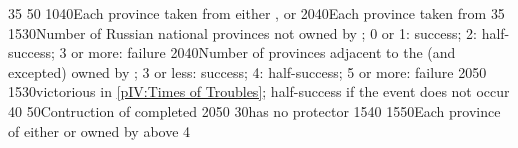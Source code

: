%
{}{35}{}%
%
{}{50}{}%
%
%
%
%
{10}{40}{Each province taken from either \paysmajeurPologne,
  \paysmajeurLithuanie or \paysukraine}%
%
%
{20}{40}{Each province taken from \paysCrimee}%
%
{}{35}{}%
%
%
%
%
{15}{30}{Number of Russian national provinces not owned by \paysmajeurRussie;
  0 or 1: success; 2: half-success; 3 or more: failure}%
%
{20}{40}{Number of provinces adjacent to the \regionBaltique (\regionSuede and
  \regionFinlande excepted) owned by \paysmajeurSuede; 3 or less: success; 4:
  half-success; 5 or more: failure}%
%
{20}{50}{}%
%
{15}{30}{\RUS victorious in \ref{pIV:Times of Troubles}; half-success if the
  event does not occur}%
%
%
%
%
{}{40}{}%
%
{}{50}{Contruction of  completed}%
%
{20}{50}{}%
%
%
%
%
{}{30}{\paysPologne has no protector}%
%
{15}{40}{}%
%
{15}{50}{Each province of either \paysCrimee or \paysMoldavie owned by
  \paysmajeurRussie above 4}%
